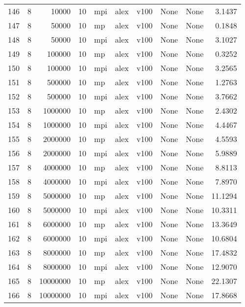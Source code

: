 \begin{tabular}{lrrrlllllr}
146 &   8 &     10000 &      10 &  mpi &  alex &  v100 &  None &  None &   3.1437 \\
147 &   8 &     50000 &      10 &   mp &  alex &  v100 &  None &  None &   0.1848 \\
148 &   8 &     50000 &      10 &  mpi &  alex &  v100 &  None &  None &   3.1027 \\
149 &   8 &    100000 &      10 &   mp &  alex &  v100 &  None &  None &   0.3252 \\
150 &   8 &    100000 &      10 &  mpi &  alex &  v100 &  None &  None &   3.2565 \\
151 &   8 &    500000 &      10 &   mp &  alex &  v100 &  None &  None &   1.2763 \\
152 &   8 &    500000 &      10 &  mpi &  alex &  v100 &  None &  None &   3.7662 \\
153 &   8 &   1000000 &      10 &   mp &  alex &  v100 &  None &  None &   2.4302 \\
154 &   8 &   1000000 &      10 &  mpi &  alex &  v100 &  None &  None &   4.4467 \\
155 &   8 &   2000000 &      10 &   mp &  alex &  v100 &  None &  None &   4.5593 \\
156 &   8 &   2000000 &      10 &  mpi &  alex &  v100 &  None &  None &   5.9889 \\
157 &   8 &   4000000 &      10 &   mp &  alex &  v100 &  None &  None &   8.8113 \\
158 &   8 &   4000000 &      10 &  mpi &  alex &  v100 &  None &  None &   7.8970 \\
159 &   8 &   5000000 &      10 &   mp &  alex &  v100 &  None &  None &  11.1294 \\
160 &   8 &   5000000 &      10 &  mpi &  alex &  v100 &  None &  None &  10.3311 \\
161 &   8 &   6000000 &      10 &   mp &  alex &  v100 &  None &  None &  13.3649 \\
162 &   8 &   6000000 &      10 &  mpi &  alex &  v100 &  None &  None &  10.6804 \\
163 &   8 &   8000000 &      10 &   mp &  alex &  v100 &  None &  None &  17.4832 \\
164 &   8 &   8000000 &      10 &  mpi &  alex &  v100 &  None &  None &  12.9070 \\
165 &   8 &  10000000 &      10 &   mp &  alex &  v100 &  None &  None &  22.1307 \\
166 &   8 &  10000000 &      10 &  mpi &  alex &  v100 &  None &  None &  17.8668 \\

\end{tabular}
